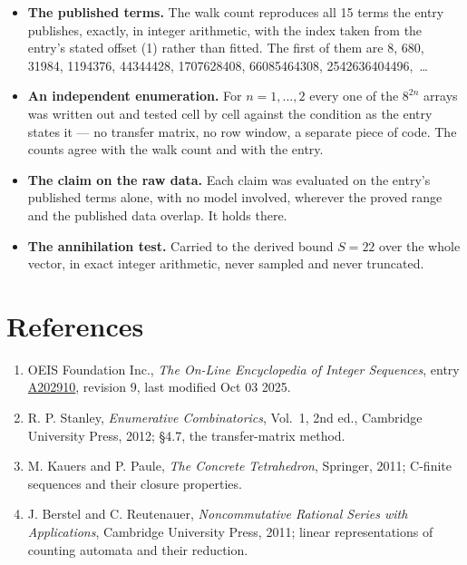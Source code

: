 \documentclass[11pt]{article}
\theoremstyle{definition}
\begin{document}
\begin{itemize}

\item {\bfseries The published terms.} The walk count reproduces all 15 terms the entry publishes, exactly, in integer arithmetic, with the index taken from the entry's stated offset (1) rather than fitted. The first of them are 8, 680, 31984, 1194376, 44344428, 1707628408, 66085464308, 2542636404496,~\dots

\item {\bfseries An independent enumeration.} For $n = 1,\dots,2$ every one of the $8^{2n}$ arrays was written out and tested cell by cell against the condition as the entry states it --- no transfer matrix, no row window, a separate piece of code. The counts agree with the walk count and with the entry.

\item {\bfseries The claim on the raw data.} Each claim was evaluated on the entry's published terms alone, with no model involved, wherever the proved range and the published data overlap. It holds there.

\item {\bfseries The annihilation test.} Carried to the derived bound $S = 22$ over the whole vector, in exact integer arithmetic, never sampled and never truncated.

\end{itemize}

\section{References}

\begin{enumerate}

\item OEIS Foundation Inc., \emph{The On-Line Encyclopedia of Integer Sequences}, entry \href{https://oeis.org/A202910}{A202910}, revision 9, last modified Oct 03 2025.

\item R. P. Stanley, \emph{Enumerative Combinatorics}, Vol.~1, 2nd ed., Cambridge University Press, 2012; \S4.7, the transfer-matrix method.

\item M. Kauers and P. Paule, \emph{The Concrete Tetrahedron}, Springer, 2011; C-finite sequences and their closure properties.

\item J. Berstel and C. Reutenauer, \emph{Noncommutative Rational Series with Applications}, Cambridge University Press, 2011; linear representations of counting automata and their reduction.

\end{enumerate}
\end{document}
